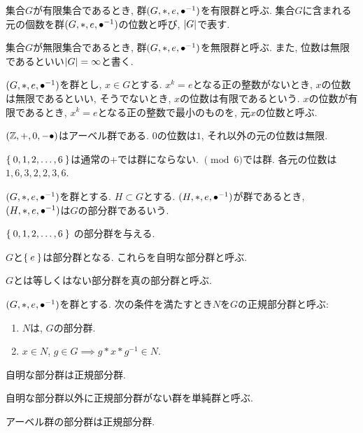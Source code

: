 \begin{definition}
  
  集合$G$が有限集合であるとき,
  群$(G,\ast,e,{\bullet}^{-1})$を有限群と呼ぶ.
  集合$G$に含まれる元の個数を群$(G,\ast,e,{\bullet}^{-1})$の位数と呼び,
  $\left|G\right|$で表す.
  
  集合$G$が無限集合であるとき,
  群$(G,\ast,e,{\bullet}^{-1})$を無限群と呼ぶ.
  また, 位数は無限であるといい$\left|G\right|=\infty$と書く.
\end{definition}

\begin{definition}
  $(G,\ast,e,{\bullet}^{-1})$を群とし,
  $x\in G$とする.
  $x^k=e$となる正の整数がないとき,
  $x$の位数は無限であるといい,
  そうでないとき,
  $x$の位数は有限であるという.
  $x$の位数が有限であるとき,
  $x^k=e$となる正の整数で最小のものを,
  元$x$の位数と呼ぶ.
\end{definition}

\begin{example}
  $(\mathbb{Z},+,0,-{\bullet})$はアーベル群である.
  $0$の位数は$1$,
  それ以外の元の位数は無限.
\end{example}

\begin{example}
  $\Set{0,1,2,\ldots,6}$は通常の$+$では群にならない.
  $\pmod{6}$では群.
  各元の位数は$1,6,3,2,2,3,6$.
\end{example}

\begin{definition}
  $(G,\ast,e,{\bullet}^{-1})$を群とする.
  $H\subset G$とする.
  $(H,\ast,e,{\bullet}^{-1})$が群であるとき,
  $(H,\ast,e,{\bullet}^{-1})$は$G$の部分群であるいう.
\end{definition}

\begin{example}
  $\Set{0,1,2,\ldots,6}$
  の部分群を与える.
\end{example}

\begin{definition}
  $G$と$\Set{e}$は部分群となる.
  これらを自明な部分群と呼ぶ.

  $G$とは等しくはない部分群を真の部分群と呼ぶ.
\end{definition}

\begin{definition}
  $(G,\ast,e,{\bullet}^{-1})$を群とする.
  次の条件を満たすとき$N$を$G$の正規部分群と呼ぶ:
  \begin{enumerate}
  \item $N$は, $G$の部分群.
  \item $x\in N$, $g\in G \implies g \ast x \ast g^{-1} \in N$.
  \end{enumerate}
\end{definition}
\begin{remark}
  自明な部分群は正規部分群.
\end{remark}
\begin{definition}
  自明な部分群以外に正規部分群がない群を単純群と呼ぶ.
\end{definition}
\begin{remark}
  アーベル群の部分群は正規部分群.
\end{remark}

